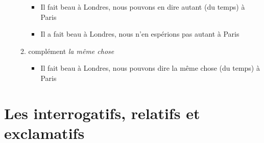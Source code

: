 \documentclass[UTF8]{report}
\begin{document}
\begin{enumerate}
\begin{enumerate}
            \begin{itemize}
                \item Il fait beau à Londres, nous pouvons en dire autant (du temps) à Paris
                \item Il a fait beau à Londres, nous n’en espérions pas autant à Paris
            \end{itemize}
            \item complément \textit{la même chose}
            \begin{itemize}
                \item Il fait beau à Londres, nous pouvons dire la même chose (du temps) à Paris
            \end{itemize}
        \end{enumerate}
\end{enumerate}


\section{Les interrogatifs, relatifs et exclamatifs}
\end{document}
